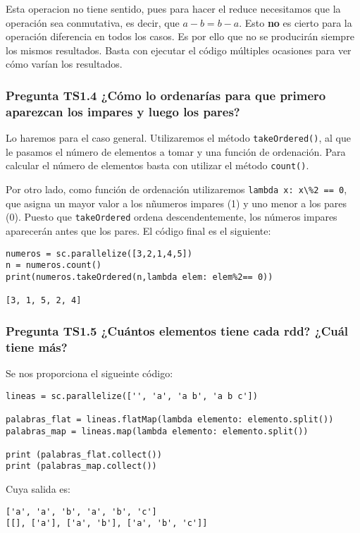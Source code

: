 \documentclass[11pt]{article}
\def\inline{\lstinline[basicstyle=\ttfamily,keywordstyle={}]}
\begin{document}
Esta operacion no tiene sentido, pues para hacer el reduce necesitamos que la operación sea conmutativa, es decir, que $a-b = b-a$. Esto \textbf{no} es cierto para la operación diferencia en todos los casos. Es por ello que no se producirán siempre los mismos resultados. Basta con ejecutar el código múltiples ocasiones para ver cómo varían los resultados.

\subsubsection*{ Pregunta TS1.4 ¿Cómo lo ordenarías para que primero aparezcan los impares y luego los pares?}

Lo haremos para el caso general. Utilizaremos el método \inline{takeOrdered()}, al que le pasamos el número de elementos a tomar y una función de ordenación. Para calcular el número de elementos basta con utilizar el método \inline{count()}.

Por otro lado, como función de ordenación utilizaremos \inline{lambda x: x\%2 == 0}, que asigna un mayor valor a los nñumeros impares (1) y uno menor a los pares (0). Puesto que \inline{takeOrdered} ordena descendentemente, los números impares aparecerán antes que los pares. El código final es el siguiente:

\begin{verbatim}
numeros = sc.parallelize([3,2,1,4,5])
n = numeros.count()
print(numeros.takeOrdered(n,lambda elem: elem%2== 0))

[3, 1, 5, 2, 4]
\end{verbatim}

\subsubsection*{ Pregunta TS1.5 ¿Cuántos elementos tiene cada rdd? ¿Cuál tiene más? }

Se nos proporciona el sigueinte código:

\begin{verbatim}
lineas = sc.parallelize(['', 'a', 'a b', 'a b c'])

palabras_flat = lineas.flatMap(lambda elemento: elemento.split())
palabras_map = lineas.map(lambda elemento: elemento.split())

print (palabras_flat.collect())
print (palabras_map.collect())
\end{verbatim}

Cuya salida es:

\begin{verbatim}
['a', 'a', 'b', 'a', 'b', 'c']
[[], ['a'], ['a', 'b'], ['a', 'b', 'c']]
\end{verbatim}
\end{document}

